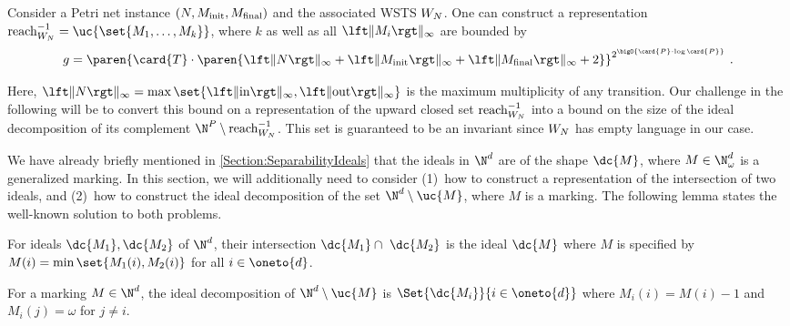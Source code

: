 \documentclass[../../diss.tex]{subfiles}
\begin{document}
\begin{theorem}%
\label{Theorem:SeparabilityBozzelliGanty}%
    Consider a Petri net instance $(N,M_{\text{init}},M_{\text{final}})$ and the associated WSTS $W_N$.
    One can construct a representation
    $\reachrev{\wstsN}=\uc{\set{M_1, \ldots, M_k}}$, where $k$ as well as all $\norminf{M_i}$ are bounded by
    \[
        g =
        \paren
        {
            \card{T} \cdot
            \paren
            {
                \norminf{N}
                +
                \norminf{M_\init}
                +
                \norminf{M_\final}
                +
                2
            }
        }^{2^{\bigO{\card{P} \cdot \log \card{P}}}}
        \ .
    \]
\end{theorem}

Here, $\norminf{N} = \max \set{ \norminf{\i}, \norminf{\o}}$ is the maximum multiplicity of any transition.
Our challenge in the following will be to convert this bound on a representation of the upward closed set $\reachrev{\wstsN}$ into a bound on the size of the ideal decomposition of its complement $\N^P \setminus \reachrev{\wstsN}$.
This set is guaranteed to be an invariant since $W_N$ has empty language in our case.

We have already briefly mentioned in \cref{Section:SeparabilityIdeals} that the ideals in $\N^d$ are of the shape $\dc{M}$, where $M \in \N_\omega^d$ is a generalized marking.
In this section, we will additionally need to consider (1)~how to construct a representation of the intersection of two ideals, and (2)~how to construct the ideal decomposition of the set $\N^d \setminus \uc{M}$, where $M$ is a marking.
The following lemma states the well-known solution to both problems.

%
\cheatpagebreak
%

\begin{lemma}%
\label{Lemma:SeparabilityIdealOperations}%
    \begin{thmenumerate}[a)]
        \item
            For ideals $\dc{M_1}, \dc{M_2}$ of $\N^d$, their intersection $\dc{M_1} \cap \ \dc{M_2}$ is the ideal $\dc{M}$ where $M$ is specified by $M(i) = \min \set{ M_1(i), M_2(i)}$ for all $i \in \oneto{d}$.
        \item
            For a marking $M \in \N^d$, the ideal decomposition of $\N^d \setminus \uc{M}$ is $\Set{ \dc{M_i}}{ i \in \oneto{d}}$ where $M_i(i) = M(i) - 1$ and $M_i(j) = \omega$ for $j \neq i$.
    \end{thmenumerate}
\end{lemma}
\end{document}
